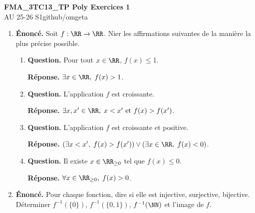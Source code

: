 \documentclass[12pt, a4paper]{article}
\newcommand{\mytitle}{FMA\_3TC13\_TP Poly Exercices 1}
\newcommand{\myauthor}{github/omgeta}
\newcommand{\mydate}{AU 25-26 S1}
\begin{document}
\raggedright
\footnotesize
\begin{center}
{\normalsize{\textbf{\mytitle}}} \\
{\footnotesize{\mydate\hspace{2pt}\textemdash\hspace{2pt}\myauthor}}
\end{center}
\begin{enumerate}[label=1.\arabic*., start=15]

  \item \begin{minipage}[t]{\linewidth}\raggedright
\textbf{Énoncé.} Soit $f:\RR\to\RR$. Nier les affirmations suivantes de la manière la plus précise possible.

\begin{enumerate}[\arabic*.]
      \item \textbf{Question.} Pour tout $x\in\RR$, $f(x)\leq1$.
\par\smallskip
\textbf{Réponse.} $\exists x \in \RR,\; f(x)>1$.

  \item \textbf{Question.} L'application $f$ est croissante.
\par\smallskip
\textbf{Réponse.} $\exists x,x'\in\RR,\;x<x' \text{ et } f(x)>f(x')$.

  \item \textbf{Question.} L'application $f$ est croissante et positive.
\par\smallskip
\textbf{Réponse.} $(\exists x<x',\;f(x)>f(x'))\lor(\exists x\in\RR,\;f(x)<0)$.

  \item \textbf{Question.} Il existe $x\in\RR_{\geq0}$ tel que $f(x)\leq0$.
\par\smallskip
\textbf{Réponse.} $\forall x\in\RR_{\geq0},\;f(x)>0$.

\end{enumerate}
\end{minipage}

  \item \begin{minipage}[t]{\linewidth}\raggedright
\textbf{Énoncé.} Pour chaque fonction, dire si elle est injective, surjective, bijective. Déterminer $f^{-1}(\{0\})$, $f^{-1}(\{0,1\})$, $f^{-1}(\NN)$ et l'image de $f$.


\end{minipage}
\end{enumerate}
\end{document}
